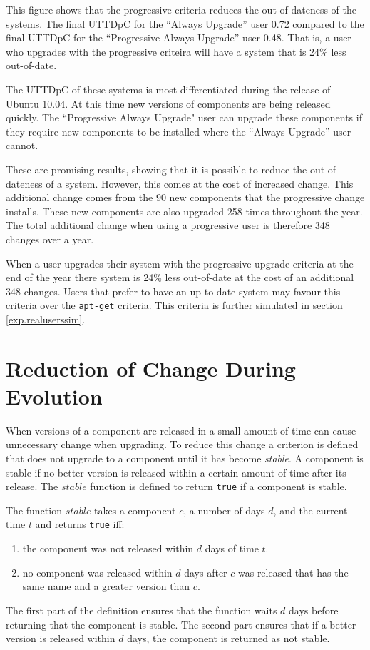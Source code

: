 This figure shows that the progressive criteria reduces the out-of-dateness of the systems.
The final UTTDpC for the ``Always Upgrade'' user 0.72 compared to the final UTTDpC for the ``Progressive Always Upgrade'' user 0.48.
That is, a user who upgrades with the progressive criteira will have a system that is 24\% less out-of-date.

The UTTDpC of these systems is most differentiated during the release of Ubuntu 10.04.
At this time new versions of components are being released quickly.
The ``Progressive Always Upgrade" user can upgrade these components if they require new components to be installed where the ``Always Upgrade'' user cannot.

These are promising results, showing that it is possible to reduce the out-of-dateness of a system.
However, this comes at the cost of increased change.
This additional change comes from the 90 new components that the progressive change installs.
These new components are also upgraded 258 times throughout the year.
The total additional change when using a progressive user is therefore 348 changes over a year.  

When a user upgrades their system with the progressive upgrade criteria at the end of the year there system is 24\% less out-of-date at the cost of an additional 348 changes.
Users that prefer to have an up-to-date system may favour this criteria over the \texttt{apt-get} criteria. 
This criteria is further simulated in section \ref{exp.realuserssim}.

\section{Reduction of Change During Evolution}
\label{exp.q3}
When versions of a component are released in a small amount of time can cause unnecessary change when upgrading.
To reduce this change a criterion is defined that does not upgrade to a component until it has become \textit{stable}.
A component is stable if no better version is released within a certain amount of time after its release.
The $stable$ function is defined to return \texttt{true} if a component is stable.
\begin{defs}
\label{exp.stablefunction}
The function $stable$ takes a component $c$, a number of days $d$, and the current time $t$ and returns \texttt{true} iff:
\begin{enumerate}
  \item the component was not released within $d$ days of time $t$.
  \item no component was released within $d$ days after $c$ was released that has the same name and a greater version than $c$.
\end{enumerate}
\end{defs}
The first part of the definition ensures that the function waits $d$ days before returning that the component is stable.
The second part ensures that if a better version is released within $d$ days, the component is returned as not stable.

